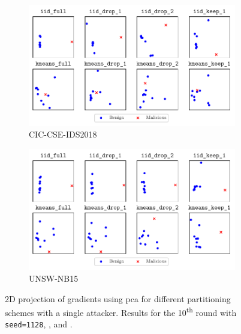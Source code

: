 \begin{figure}[t]
  \centering
  \begin{subfigure}{\linewidth}
    \centering
    \includegraphics[width=.6\linewidth]{figures/cicids/similarity-untargeted-single}
    \caption{
      CIC-CSE-IDS2018
      \label{fig:similarity.cicids-single}
    }
  \end{subfigure}
  \begin{subfigure}{\linewidth}
    \centering
    \includegraphics[width=.6\linewidth]{figures/nb15/similarity-untargeted-single}
    \caption{
      UNSW-NB15
      \label{fig:similarity.nb15-single}
    }
  \end{subfigure}
  \caption[
    2D projection of gradients using \gls{pca} for different partitioning schemes with a single attacker.
  ]{
    2D projection of gradients using \gls{pca} for different partitioning schemes with a single attacker.
    Results for the 10\textsuperscript{th} round with \texttt{seed=1128}, , and . 
    \label{fig:similarity-single}
  }
\end{figure}

